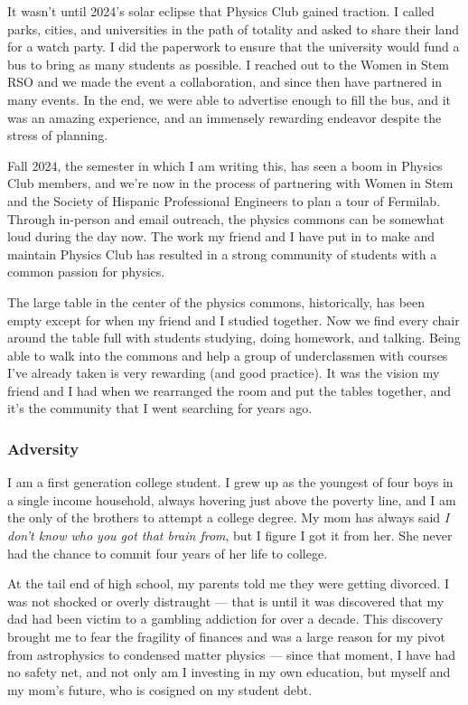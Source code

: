 \documentclass[11pt]{article}
\begin{document}
It wasn't until 2024's solar eclipse that Physics Club gained traction. I called parks, cities, and universities in the path of totality and asked to share their land for a watch party. I did the paperwork to ensure that the university would fund a bus to bring as many students as possible. I reached out to the Women in Stem RSO and we made the event a collaboration, and since then have partnered in many events. In the end, we were able to advertise enough to fill the bus, and it was an amazing experience, and an immensely rewarding endeavor despite the stress of planning.

Fall 2024, the semester in which I am writing this, has seen a boom in Physics Club members, and we're now in the process of partnering with Women in Stem and the Society of Hispanic Professional Engineers to plan a tour of Fermilab. Through in-person and email outreach, the physics commons can be somewhat loud during the day now. The work my friend and I have put in to make and maintain Physics Club has resulted in a strong community of students with a common passion for physics.

The large table in the center of the physics commons, historically, has been empty except for when my friend and I studied together. Now we find every chair around the table full with students studying, doing homework, and talking. Being able to walk into the commons and help a group of underclassmen with courses I've already taken is very rewarding (and good practice). It was the vision my friend and I had when we rearranged the room and put the tables together, and it's the community that I went searching for years ago.
\subsubsection*{Adversity}
I am a first generation college student. I grew up as the youngest of four boys in a single income household, always hovering just above the poverty line, and I am the only of the brothers to attempt a college degree. My mom has always said \textit{I don't know who you got that brain from}, but I figure I got it from her. She never had the chance to commit four years of her life to college. 

At the tail end of high school, my parents told me they were getting divorced. I was not shocked or overly distraught --- that is until it was discovered that my dad had been victim to a gambling addiction for over a decade. This discovery brought me to fear the fragility of finances and was a large reason for my pivot from astrophysics to condensed matter physics --- since that moment, I have had no safety net, and not only am I investing in my own education, but myself and my mom's future, who is cosigned on my student debt.
\end{document}
